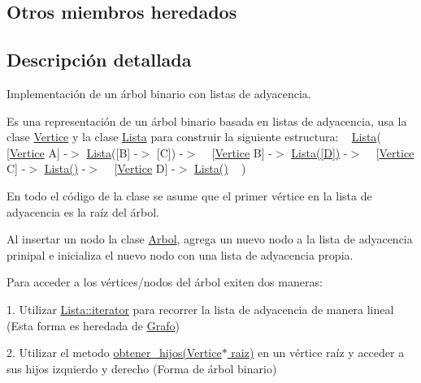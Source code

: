 \subsection*{Otros miembros heredados}


\subsection{Descripción detallada}
Implementación de un árbol binario con listas de adyacencia. ~\newline
 

Es una representación de un árbol binario basada en listas de adyacencia, usa la clase \hyperlink{classVertice}{Vertice} y la clase \hyperlink{classLista}{Lista} para construir la siguiente estructura\+: ~\newline
 \hyperlink{classLista}{Lista}( ~\newline
 \mbox{[}\hyperlink{classVertice}{Vertice} A\mbox{]} -\/$>$ \hyperlink{classLista}{Lista}(\mbox{[}B\mbox{]} -\/$>$ \mbox{[}C\mbox{]}) -\/$>$ ~\newline
 \mbox{[}\hyperlink{classVertice}{Vertice} B\mbox{]} -\/$>$ \hyperlink{classLista}{Lista(\mbox{[}\+D\mbox{]})} -\/$>$ ~\newline
 \mbox{[}\hyperlink{classVertice}{Vertice} C\mbox{]} -\/$>$ \hyperlink{classLista}{Lista()} -\/$>$ ~\newline
 \mbox{[}\hyperlink{classVertice}{Vertice} D\mbox{]} -\/$>$ \hyperlink{classLista}{Lista()} ~\newline
 )

En todo el código de la clase se asume que el primer vértice en la lista de adyacencia es la raíz del árbol.

Al insertar un nodo la clase \hyperlink{classArbol}{Arbol}, agrega un nuevo nodo a la lista de adyacencia prinipal e inicializa el nuevo nodo con una lista de adyacencia propia.

Para acceder a los vértices/nodos del árbol exiten dos maneras\+:
\begin{DoxyItemize}
\item 1. Utilizar \hyperlink{classLista_1_1iterator}{Lista\+::iterator} para recorrer la lista de adyacencia de manera lineal (Esta forma es heredada de \hyperlink{classGrafo}{Grafo})
\item 2. Utilizar el metodo \hyperlink{classArbol_a18066699977ab8095398d026ef2a13ac}{obtener\+\_\+hijos(\+Vertice$\ast$ raiz)} en un vértice raíz y acceder a sus hijos izquierdo y derecho (Forma de árbol binario)
\end{DoxyItemize}

